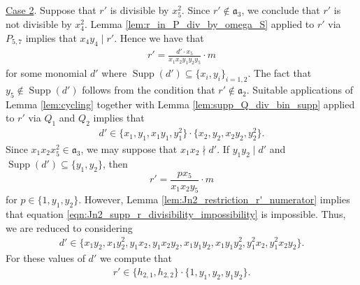 \documentclass[12pt,a4paper]{amsart}
\theoremstyle{plain}
\theoremstyle{definition}
\theoremstyle{remark}
\def\a{\mathfrak{a}}
\DeclareMathOperator{\Supp}{Supp}
\newcommand{\ul}[1]{\underline{#1}}
\renewcommand{\subset}{\subseteq}
\begin{document}
\ul{Case 2}. Suppose that $r'$ is divisible by $x_{5}^{2}$. Since $r' \notin \a_{3}$, we conclude that $r'$ is not divisible by $x_{4}^{2}$. Lemma \ref{lem:r_in_P_div_by_omega_S} applied to $r'$ via $P_{5,7}$ implies that $x_{4}y_{4} \mid r'$. Hence we have that
\begin{align*}
    r' = \frac{d'\cdot x_{5}}{x_{1}x_{2}y_{1}y_{2}y_{5}} \cdot m
\end{align*}
for some monomial $d'$ where $\Supp(d') \subset \{x_{i},y_{i}\}_{i=1,2}$. The fact that $y_{5} \notin \Supp(d')$ follows from the condition that $r' \notin \a_{2}$. Suitable applications of Lemma \ref{lem:cycling} together with Lemma \ref{lem:supp_Q_div_bin_supp} applied to $r'$ via $Q_{1}$ and $Q_{2}$ implies that
\begin{align*}
    d' \in \{x_{1},y_{1},x_{1}y_{1},y_{1}^{2}\}\cdot \{x_{2},y_{2},x_{2}y_{2},y_{2}^{2}\}.
\end{align*}
Since $x_{1}x_{2}x_{5}^{2} \in \a_{3}$, we may suppose that $x_{1} x_{2} \nmid d'$. If $y_{1}y_{2} \mid d'$ and $\Supp(d') \subset \{y_{1},y_{2}\}$, then 
\begin{equation}
    \label{eqn:Jn2_supp_r_divisibility_impossibility}
    r' = \frac{p x_{5}}{x_{1}x_{2}y_{5}}\cdot m
\end{equation}
for $p \in \{1,y_{1},y_{2}\}$. However, Lemma \ref{lem:Jn2_restriction_r'_numerator} implies that equation \eqref{eqn:Jn2_supp_r_divisibility_impossibility} is impossible. Thus, we are reduced to considering 
\begin{align*}
    d' \in \{x_{1}y_{2},x_{1}y_{2}^{2},y_{1}x_{2},y_{1}x_{2}y_{2},x_{1}y_{1}y_{2},x_{1}y_{1}y_{2}^{2},y_{1}^{2}x_{2},y_{1}^{2}x_{2}y_{2}\}.
\end{align*}
For these values of $d'$ we compute that
\begin{align*}
    r' \in \{h_{2,1},h_{2,2} \}\cdot \{1,y_{1},y_{2},y_{1}y_{2} \}.
\end{align*}
\end{document}
